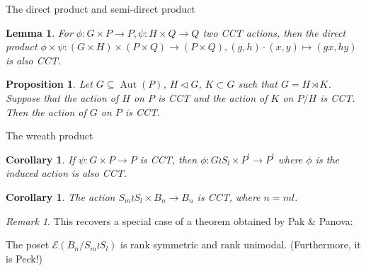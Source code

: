 \documentclass{beamer}
\newtheorem{cor}[thm]{Corollary}
\newtheorem{lem}[thm]{Lemma}
\newtheorem{prop}[thm]{Proposition}
\theoremstyle{remark}
\newtheorem{rem}[thm]{Remark}
\begin{document}
\begin{frame}{The direct product and semi-direct product}
\begin{lem}
\label{thm:direct_product_preservation}
For $\phi:G\times P\rightarrow P,\psi:H \times Q \rightarrow Q$ two CCT actions, then the direct product $\phi \times \psi:(G\times H)\times (P\times Q) \rightarrow (P\times Q),(g,h)\cdot (x,y) \mapsto (gx,hy)$ is also CCT.
\end{lem}





\begin{prop}\label{prop:semidirect_product_cover_transitive_actions}
Let $G\subseteq \operatorname{Aut}(P)$, $H\triangleleft G$, $K\subset G$ such that $G = H\rtimes K$.  Suppose that the action of $H$ on $P$ is CCT and the action of $K$ on $P/H$ is CCT.  Then the action of $G$ on $P$ is CCT.
\end{prop}
\end{frame}





\begin{frame}{The wreath product}
\begin{cor}
\label{thm:wreath_preservation}
If $\psi:G\times P \rightarrow P$ is CCT, then $\phi:G\wr S_l \times P^l \rightarrow P^l$ where $\phi$ is the induced action is also CCT.
\end{cor}
\pause
\begin{cor}
The action $S_m \wr S_l \times B_{n} \rightarrow B_{n}$ is CCT, where $n =ml$.
\end{cor}
\pause
\begin{rem}
This recovers a special case of a theorem obtained by Pak \& Panova: 

The poset $\mathcal E (B_n/S_m \wr S_l)$ is rank symmetric and rank unimodal. (Furthermore, it is Peck!)
\end{rem}
\end{frame}





\end{document}
